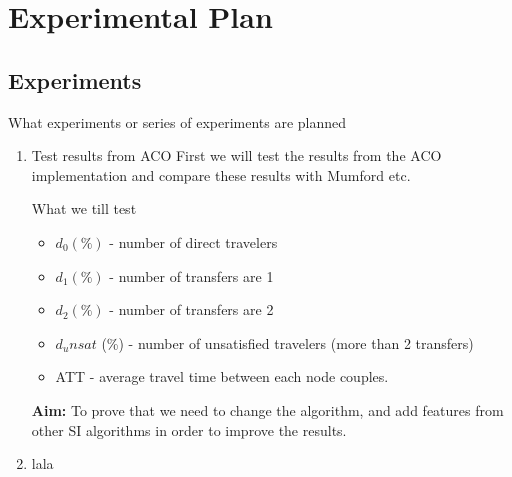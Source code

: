 \section{Experimental Plan}





\subsection{Experiments}
What experiments or series of experiments are planned

\begin{enumerate}
\item Test results from ACO
First we will test the results from the ACO implementation and compare these results with Mumford etc. 

What we till test
\begin{itemize}
\item $d_0 (\%)$ - number of direct travelers
\item $d_1 (\%)$ - number of transfers are 1
\item $d_2 (\%)$ - number of transfers are 2
\item $d_unsat$ (\%) - number of unsatisfied travelers (more than 2 transfers)
\item ATT  - average travel time between each node couples.  
\end{itemize}

\textbf{Aim:} To prove that we need to change the algorithm, and add features from other SI algorithms in order to improve the results.
\item lala
\end{enumerate}


